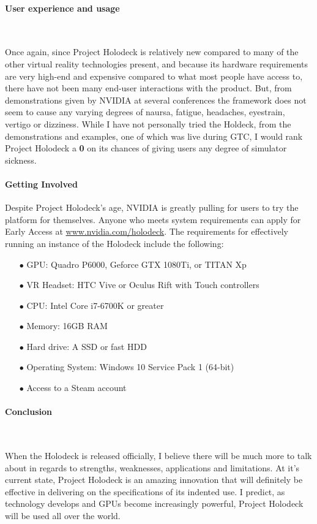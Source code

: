 \documentclass[11pt]{article}
\begin{document}
\paragraph{User experience and usage} ~ \par  
Once again, since Project Holodeck is relatively new compared to many of the other virtual reality technologies present, and because its hardware requirements are very high-end and expensive compared to what most people have access to, there have not been many end-user interactions with the product. But, from demonstrations given by NVIDIA at several conferences \cite{video1, video2, video3} the framework does not seem to cause any varying degrees of naursa, fatigue, headaches, eyestrain, vertigo or dizziness. While I have not personally tried the Holdeck, from the demonstrations and examples, one of which was live during GTC, I would rank Project Holodeck a \textbf{0} on its chances of giving users any degree of simulator sickness.

\paragraph{Getting Involved}
Despite Project Holodeck's age, NVIDIA is greatly pulling for users to try the platform for themselves. Anyone who meets system requirements can apply for Early Access at \url{www.nvidia.com/holodeck}. The requirements for effectively running an instance of the Holodeck include the following:
\begin{center}
\begin{enumerate}
\item[$\bullet$]GPU: Quadro P6000, Geforce GTX 1080Ti, or TITAN Xp
\item[$\bullet$]VR Headset: HTC Vive or Oculus Rift with Touch controllers
\item[$\bullet$]CPU: Intel Core i7-6700K or greater
\item[$\bullet$]Memory: 16GB RAM
\item[$\bullet$]Hard drive: A SSD or fast HDD
\item[$\bullet$]Operating System: Windows 10 Service Pack 1 (64-bit)
\item[$\bullet$]Access to a Steam account
\end{enumerate}
\end{center}

\paragraph{Conclusion} ~ \par 
When the Holodeck is released officially, I believe there will be much more to talk about in regards to strengths, weaknesses, applications and limitations. At it's current state, Project Holodeck is an amazing innovation that will definitely be effective in delivering on the specifications of its indented use. I predict, as technology develops and GPUs become increasingly powerful, Project Holodeck will be used all over the world.
\end{document}
